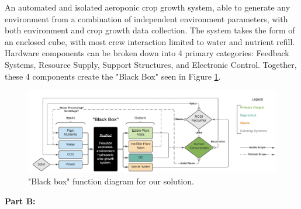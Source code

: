 \documentclass{report}
\begin{document}
An automated and isolated aeroponic crop growth system, able to generate any environment from a combination of independent environment parameters, with both environment and crop growth data collection.
The system takes the form of an enclosed cube, with most crew interaction limited to water and nutrient refill. Hardware components can be broken down into 4 primary categories: Feedback Systems, Resource Supply, Support Structures, and Electronic Control. 
Together, these 4 components create the "Black Box" seen in Figure \ref{fig:blackbox}.

\begin{figure}[h]
    \centering
    \includegraphics[width=15cm]{../solutionoverview/images/blackbox.png}
    \hfill
    \caption{"Black box" function diagram for our solution.}
    \label{fig:blackbox}
\end{figure}

\textbf{Part B:}




\end{document}
